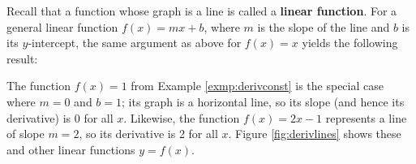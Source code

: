 Recall that a function whose graph is a line is called a
\textbf{linear function}. For a
general linear function $f(x) = mx + b$, where $m$ is the slope of the line and
$b$ is its $y$-intercept, the same argument as above for $f(x) = x$ yields the
following result:


The function $f(x) = 1$ from Example \ref{exmp:derivconst} is the special case
where $m = 0$ and $b = 1$; its graph is a horizontal line, so its slope (and
hence its derivative) is 0 for all $x$. Likewise, the function $f(x) = 2x - 1$
represents a line of slope $m = 2$, so its derivative is 2 for all $x$. Figure
\ref{fig:derivlines} shows these and other linear functions $y=f(x)$.

